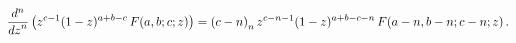 \[\frac{{d}^{n}}{{dz}^{n}}\left(z^{c-1}(1-z)^{a+b-c}\mathop{F\/}\nolimits\!\left%
(a,b;c;z\right)\right)=\left(c-n\right)_{n}z^{c-n-1}(1-z)^{a+b-c-n}\*\mathop{F%
\/}\nolimits\!\left(a-n,b-n;c-n;z\right).\]